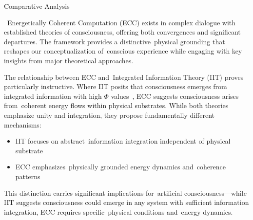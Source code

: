 \h{Comparative Analysis}

\begin{refsection}

  ~Energetically Coherent Computation (ECC) exists in complex dialogue with established theories of consciousness, offering both convergences and significant departures. The framework provides a distinctive~physical grounding that reshapes our conceptualization of~conscious experience while engaging with key insights from major theoretical approaches.

  The relationship between ECC and~Integrated Information Theory (IIT) proves particularly instructive. Where IIT posits that consciousness emerges from integrated information with high $\Phi$ values~\cite{Koch2018, Tononi2016}, ECC suggests consciousness arises from~coherent energy flows within physical substrates. While both theories emphasize unity and integration, they propose fundamentally different mechanisms:
  \begin{itemize}
    \item IIT focuses on abstract~information integration independent of physical substrate
    \item ECC emphasizes~physically grounded energy dynamics and~coherence patterns
  \end{itemize}
  This distinction carries significant implications for~artificial consciousness—while IIT suggests consciousness could emerge in any system with sufficient information integration, ECC requires specific~physical conditions and~energy dynamics.


\end{refsection}
